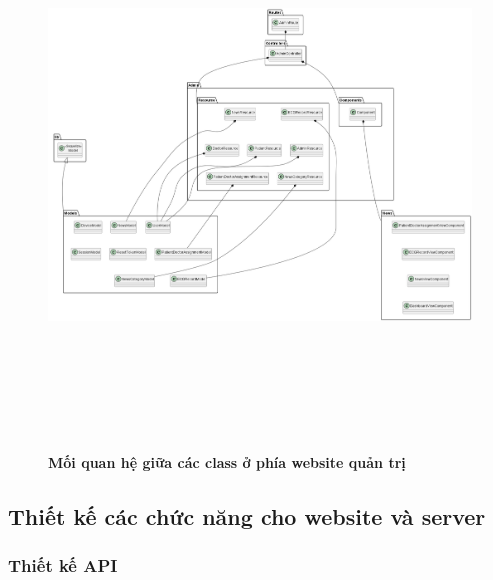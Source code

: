\begin{enumerate}[a)]
\begin{figure}[H]
  \centering
  \includegraphics[width=16cm,height=15cm]{Images/server/class/class_admin_relation.png}
  \caption[Mối quan hệ giữa các class ở phía website quản trị]{\bfseries \fontsize{12pt}{0pt}\selectfont Mối quan hệ giữa các class ở phía website quản trị}
  \label{class_admin_relation} %
\end{figure}

\end{enumerate}



\subsection{Thiết kế các chức năng cho website và server}

\subsubsection{Thiết kế API}


